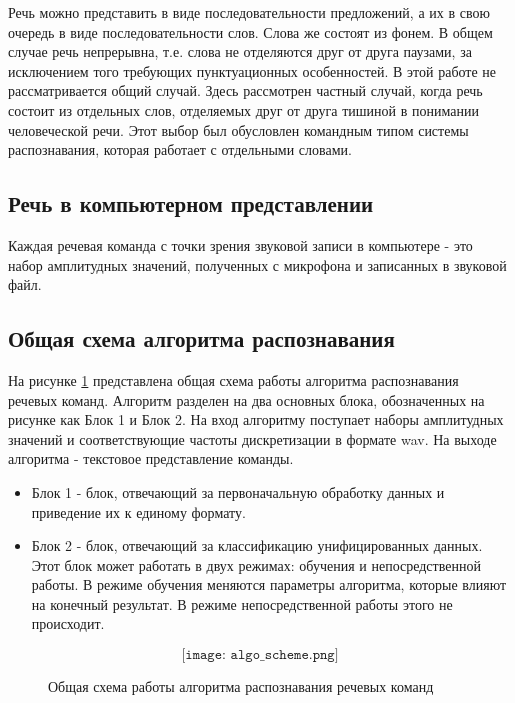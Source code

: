 Речь можно представить в виде последовательности предложений, а их в свою очередь в виде последовательности слов. Слова же состоят из фонем. В общем случае речь непрерывна, т.е. слова не отделяются друг от друга паузами, за исключением того требующих пунктуационных особенностей. В этой работе не рассматривается общий случай. Здесь рассмотрен частный случай, когда речь состоит из отдельных слов, отделяемых друг от друга тишиной в понимании человеческой речи. Этот выбор был обусловлен командным типом системы распознавания, которая работает с отдельными словами.

\subsection{Речь в компьютерном представлении}
Каждая речевая команда с точки зрения звуковой записи в компьютере - это набор амплитудных значений, полученных с микрофона и записанных в звуковой файл.

\subsection{Общая схема алгоритма распознавания}
На рисунке \ref{fig:algo_scheme} представлена общая схема работы алгоритма распознавания речевых команд. Алгоритм разделен на два основных блока, обозначенных на рисунке как Блок 1 и Блок 2. На вход алгоритму поступает наборы амплитудных значений и соответствующие частоты дискретизации в формате wav. На выходе алгоритма - текстовое представление команды.

\begin{itemize}[leftmargin=2cm]
\item Блок 1 - блок, отвечающий за первоначальную обработку данных и приведение их к единому формату. 
\item Блок 2 - блок, отвечающий за классификацию унифицированных данных. Этот блок может работать в двух режимах: обучения и непосредственной работы. В режиме обучения меняются параметры алгоритма, которые влияют на конечный результат. В режиме непосредственной работы этого не происходит.
\end{itemize}


\begin{figure}[H]
  \[\texttt{[image: algo\_scheme.png]}\]
  \caption{Общая схема работы алгоритма распознавания речевых команд}
  \label{fig:algo_scheme}
\end{figure}
